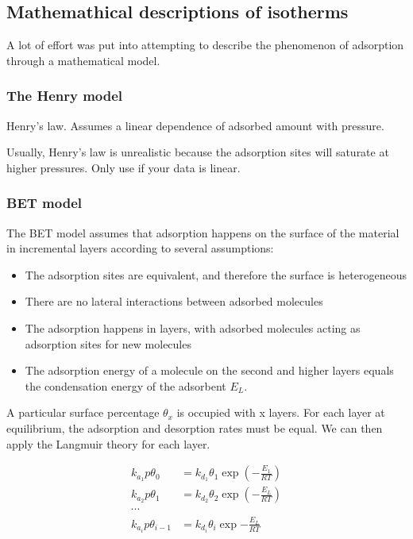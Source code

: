\subsection{Mathemathical descriptions of isotherms}

A lot of effort was put into attempting to describe 
the phenomenon of adsorption through a mathematical model.



\subsubsection{The Henry model}

Henry's law. Assumes a linear dependence of adsorbed amount with
pressure.

Usually, Henry's law is unrealistic because the adsorption sites
will saturate at higher pressures.
Only use if your data is linear.

\subsubsection{BET model}

The BET model assumes that adsorption happens on the surface of the material in
incremental layers according to several assumptions:

\begin{itemize}
    \item The adsorption sites are equivalent, and therefore the surface is heterogeneous
    \item There are no lateral interactions between adsorbed molecules
    \item The adsorption happens in layers, with adsorbed molecules acting as adsorption
    sites for new molecules
    \item The adsorption energy of a molecule on the second and higher layers equals
    the condensation energy of the adsorbent \(E_L\).
\end{itemize}

A particular surface percentage \(\theta_x\) is occupied with x layers.
For each layer at equilibrium, the adsorption and desorption rates must be equal. We can
then apply the Langmuir theory for each layer.

\begin{align}
    k_{a_1} p \theta_0 &= k_{d_1} \theta_1 \exp{(-\frac{E_1}{RT})} \\
    k_{a_2} p \theta_1 &= k_{d_2} \theta_2 \exp{(-\frac{E_L}{RT})} \\
    \cdots \\
    k_{a_i} p \theta_{i-1} &= k_{d_i} \theta_i \exp{-\frac{E_L}{RT}} \\
\end{align}

